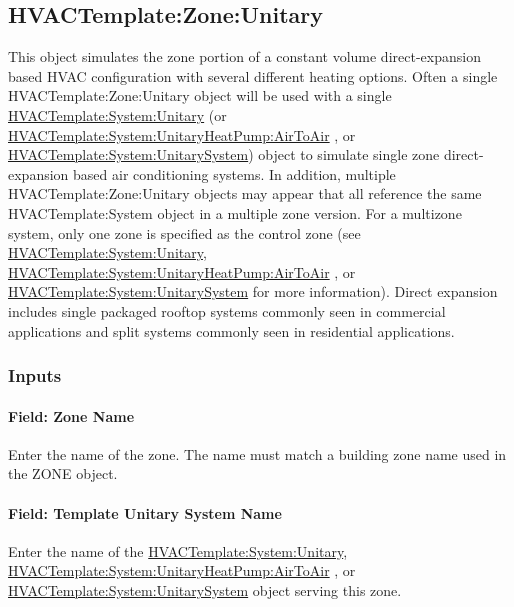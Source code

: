\subsection{HVACTemplate:Zone:Unitary}\label{hvactemplatezoneunitary}

This object simulates the zone portion of a constant volume direct-expansion based HVAC configuration with several different heating options. Often a single HVACTemplate:Zone:Unitary object will be used with a single \hyperref[hvactemplatesystemunitary]{HVACTemplate:System:Unitary} (or \hyperref[hvactemplatesystemunitaryheatpumpairtoair]{HVACTemplate:System:UnitaryHeatPump:AirToAir} , or \hyperref[hvactemplatesystemunitarysystem]{HVACTemplate:System:UnitarySystem}) object to simulate single zone direct-expansion based air conditioning systems. In addition, multiple HVACTemplate:Zone:Unitary objects may appear that all reference the same HVACTemplate:System object in a multiple zone version. For a multizone system, only one zone is specified as the control zone (see \hyperref[hvactemplatesystemunitary]{HVACTemplate:System:Unitary}, \hyperref[hvactemplatesystemunitaryheatpumpairtoair]{HVACTemplate:System:UnitaryHeatPump:AirToAir} , or \hyperref[hvactemplatesystemunitarysystem]{HVACTemplate:System:UnitarySystem} for more information). Direct expansion includes single packaged rooftop systems commonly seen in commercial applications and split systems commonly seen in residential applications.

\subsubsection{Inputs}\label{inputs-8-009}

\paragraph{Field: Zone Name}\label{field-zone-name-7-001}

Enter the name of the zone. The name must match a building zone name used in the ZONE object.

\paragraph{Field: Template Unitary System Name}\label{field-template-unitary-system-name}

Enter the name of the \hyperref[hvactemplatesystemunitary]{HVACTemplate:System:Unitary}, \hyperref[hvactemplatesystemunitaryheatpumpairtoair]{HVACTemplate:System:UnitaryHeatPump:AirToAir} , or \hyperref[hvactemplatesystemunitarysystem]{HVACTemplate:System:UnitarySystem} object serving this zone.

